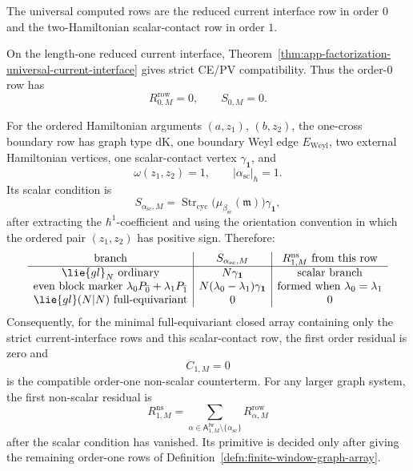 \begin{prop}\label{prop:first-finite-window-array-rows}
  The universal computed rows are the reduced current interface row in
  order \(0\) and the two-Hamiltonian scalar-contact row in order \(1\).

  On the length-one reduced current interface,
  Theorem~\ref{thm:app-factorization-universal-current-interface} gives
  strict CE/PV compatibility.  Thus the order-\(0\) row has
  \[
    R^{\mathrm{row}}_{0,M}=0,\qquad S_{0,M}=0.
  \]

  For the ordered Hamiltonian arguments \((a,z_1)\), \((b,z_2)\), the
  one-cross boundary row has graph type \(\mathrm{dK}\), one boundary Weyl
  edge \(E_{\mathrm{Weyl}}\), two external Hamiltonian vertices, one
  scalar-contact vertex \(\gamma_{\mathbf 1}\), and
  \[
    \omega(z_1,z_2)=1,\qquad |\alpha_{\mathrm{sc}}|_\hbar=1.
  \]
  Its scalar condition is
  \[
    S_{\alpha_{\mathrm{sc}},M}
      =
    \operatorname{Str}_{\mathrm{cyc}}
      \bigl(\mu_{\beta_{\mathrm{sc}}}(\mathfrak m)\bigr)
    \gamma_{\mathbf 1},
  \]
  after extracting the \(\hbar^1\)-coefficient and using the orientation
  convention in which the ordered pair \((z_1,z_2)\) has positive sign.
  Therefore:
  \[
  \begin{array}{c|c|c}
    \text{branch} & S_{\alpha_{\mathrm{sc}},M} &
    R^{\mathrm{ns}}_{1,M}\text{ from this row}\\ \hline
    \lie{gl}_N\text{ ordinary} & N\gamma_{\mathbf 1} & \text{scalar branch}\\
    \text{even block marker }\lambda_0P_{\bar0}+\lambda_1P_{\bar1}
      & N(\lambda_0-\lambda_1)\gamma_{\mathbf 1} & \text{formed when }
        \lambda_0=\lambda_1\\
    \lie{gl}(N|N)\text{ full-equivariant}
      & 0 & 0
  \end{array}
  \]
  Consequently, for the minimal full-equivariant closed array containing only
  the strict current-interface rows and this scalar-contact row, the first
  order residual is zero and
  \[
    C_{1,M}=0
  \]
  is the compatible order-one non-scalar counterterm.  For any larger graph
  system, the first non-scalar residual is
  \[
    R^{\mathrm{ns}}_{1,M}
      =
    \sum_{\alpha\in
      \mathsf A^{\mathrm{fw}}_{1,M}\setminus\{\alpha_{\mathrm{sc}}\}}
      R^{\mathrm{row}}_{\alpha,M}
  \]
  after the scalar condition has vanished.  Its primitive is decided only
  after giving the remaining order-one rows of
  Definition~\ref{defn:finite-window-graph-array}.
\end{prop}

